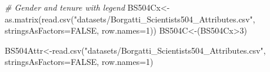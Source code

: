 \documentclass[
  notitlepage,
  onecolumn,
  openany]{book}
\newenvironment{Shaded}{\begin{snugshade}}{\end{snugshade}}
\newcommand{\AttributeTok}[1]{\textcolor[rgb]{0.77,0.63,0.00}{#1}}
\newcommand{\CommentTok}[1]{\textcolor[rgb]{0.56,0.35,0.01}{\textit{#1}}}
\newcommand{\ConstantTok}[1]{\textcolor[rgb]{0.00,0.00,0.00}{#1}}
\newcommand{\DecValTok}[1]{\textcolor[rgb]{0.00,0.00,0.81}{#1}}
\newcommand{\FunctionTok}[1]{\textcolor[rgb]{0.00,0.00,0.00}{#1}}
\newcommand{\NormalTok}[1]{#1}
\newcommand{\OtherTok}[1]{\textcolor[rgb]{0.56,0.35,0.01}{#1}}
\newcommand{\SpecialCharTok}[1]{\textcolor[rgb]{0.00,0.00,0.00}{#1}}
\newcommand{\StringTok}[1]{\textcolor[rgb]{0.31,0.60,0.02}{#1}}
\begin{document}
\begin{Shaded}
\begin{Highlighting}[]
\CommentTok{\# Gender and tenure with legend}
\NormalTok{BS504Cx}\OtherTok{\textless{}{-}}\FunctionTok{as.matrix}\NormalTok{(}\FunctionTok{read.csv}\NormalTok{(}\StringTok{"datasets/Borgatti\_Scientists504\_Attributes.csv"}\NormalTok{,}
                            \AttributeTok{stringsAsFactors=}\ConstantTok{FALSE}\NormalTok{, }\AttributeTok{row.names=}\DecValTok{1}\NormalTok{))}
\NormalTok{BS504C}\OtherTok{\textless{}{-}}\NormalTok{(BS504Cx}\SpecialCharTok{\textgreater{}}\DecValTok{3}\NormalTok{)}

\NormalTok{BS504Attr}\OtherTok{\textless{}{-}}\FunctionTok{read.csv}\NormalTok{(}\StringTok{"datasets/Borgatti\_Scientists504\_Attributes.csv"}\NormalTok{,}
                    \AttributeTok{stringsAsFactors=}\ConstantTok{FALSE}\NormalTok{, }\AttributeTok{row.names=}\DecValTok{1}\NormalTok{)}
\end{Highlighting}
\end{Shaded}
\end{document}
